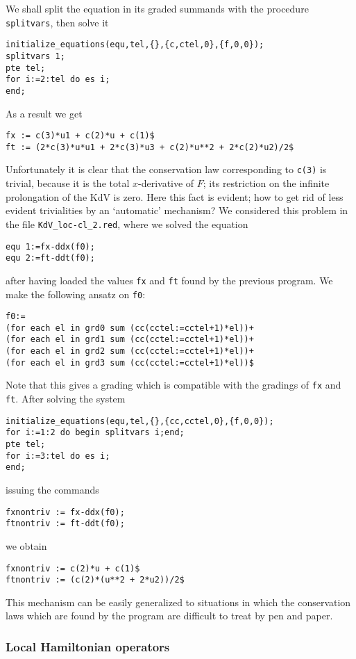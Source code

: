We shall split the equation in its graded summands with the procedure
\texttt{splitvars}, then solve it
\begin{verbatim}
initialize_equations(equ,tel,{},{c,ctel,0},{f,0,0});
splitvars 1;
pte tel;
for i:=2:tel do es i;
end;
\end{verbatim}
As a result we get
\begin{verbatim}
fx := c(3)*u1 + c(2)*u + c(1)$
ft := (2*c(3)*u*u1 + 2*c(3)*u3 + c(2)*u**2 + 2*c(2)*u2)/2$
\end{verbatim}
Unfortunately it is clear that the conservation law corresponding to
\texttt{c(3)} is trivial, because it is the total $x$-derivative of $F$; its
restriction on the infinite prolongation of the KdV is zero. Here this fact is
evident; how to get rid of less evident trivialities by an `automatic'
mechanism? We considered this problem in the file \texttt{KdV\_loc-cl\_2.red},
where we solved the equation
\begin{verbatim}
equ 1:=fx-ddx(f0);
equ 2:=ft-ddt(f0);
\end{verbatim}
after having loaded the values \texttt{fx} and \texttt{ft} found by the
previous program. We make the following ansatz on \texttt{f0}:
\begin{verbatim}
f0:=
(for each el in grd0 sum (cc(cctel:=cctel+1)*el))+
(for each el in grd1 sum (cc(cctel:=cctel+1)*el))+
(for each el in grd2 sum (cc(cctel:=cctel+1)*el))+
(for each el in grd3 sum (cc(cctel:=cctel+1)*el))$
\end{verbatim}
Note that this gives a grading which is compatible with the gradings of
\texttt{fx} and \texttt{ft}. After solving the system
\begin{verbatim}
initialize_equations(equ,tel,{},{cc,cctel,0},{f,0,0});
for i:=1:2 do begin splitvars i;end;
pte tel;
for i:=3:tel do es i;
end;
\end{verbatim}
issuing the commands
\begin{verbatim}
fxnontriv := fx-ddx(f0);
ftnontriv := ft-ddt(f0);
\end{verbatim}
we obtain
\begin{verbatim}
fxnontriv := c(2)*u + c(1)$
ftnontriv := (c(2)*(u**2 + 2*u2))/2$
\end{verbatim}
This mechanism can be easily generalized to situations in which the
conservation laws which are found by the program are difficult to treat by pen
and paper.


\subsubsection{Local Hamiltonian operators}
\label{sec:local-hamilt-oper}

